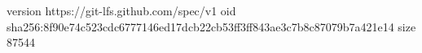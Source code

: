 version https://git-lfs.github.com/spec/v1
oid sha256:8f90e74c523cdc6777146ed17dcb22cb53ff3ff843ae3c7b8c87079b7a421e14
size 87544

